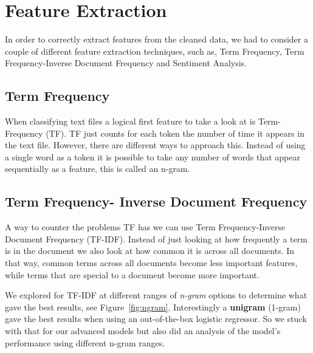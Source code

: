 \section{Feature Extraction}
In order to correctly extract features from the cleaned data, we had to consider a couple of different feature extraction techniques, such as, Term Frequency, Term Frequency-Inverse Document Frequency and Sentiment Analysis.

\subsection{Term Frequency}

When classifying text files a logical first feature to take a look at is Term-Frequency (TF).
TF just counts for each token the number of time it appears in the text file.
However, there are different ways to approach this. 
Instead of using a single word as a token it is possible to take any number of words that appear sequentially  as a feature, this is called an n-gram.

\subsection{Term Frequency- Inverse Document Frequency}

A way to counter the problems TF has we can use Term Frequency-Inverse Document Frequency (TF-IDF).
Instead of just looking at how frequently a term is in the document we also look at how common it is across all documents.
In that way, common terms across all documents become less important features, while terms that are special to a document become more important.

We explored for TF-IDF at different ranges of \textit{n-gram} options to determine what gave the best results, see Figure~\ref{fig:ngram}.
Interestingly a \textbf{unigram} (1-gram) gave the best results when using an out-of-the-box logistic regressor. So we stuck with that for our advanced models but also did an analysis of the model's performance using different n-gram ranges.

